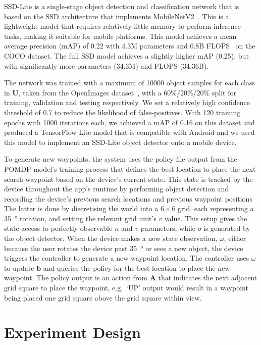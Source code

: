 \documentclass[runningheads]{llncs}
\begin{document}
SSD-Lite is a single-stage object detection and classification network that is based on the SSD architecture that implements MobileNetV2~\cite{sandler2018mobilenetv2}.
This is a lightweight model that requires relatively little memory to perform inference tasks, making it suitable for mobile platforms. 
This model achieves a mean average precision (mAP) of 0.22 with 4.3M parameters and 0.8B FLOPS~\cite{li2018tinydsod} on the COCO dataset.
The full SSD model achieves a slightly higher mAP (0.25), but with significantly more parameters (34.3M) and FLOPS (34.36B).

The network was trained with a maximum of 10000 object samples for each class in $\mathbf{U}$, taken from the OpenImages dataset~\cite{openimages}, with a 60\%/20\%/20\% split for training, validation and testing respectively.
We set a relatively high confidence threshold of 0.7 to reduce the likelihood of false-positives.
With 120 training epochs with 1000 iterations each, we achieved a mAP of 0.16 on this dataset and produced a TensorFlow Lite model that is compatible with Android and we used this model to implement an SSD-Lite object detector onto a mobile device.

To generate new waypoints, the system uses the policy file output from the POMDP model's training process that defines the best location to place the next search waypoint based on the device's current state.
This state is tracked by the device throughout the app's runtime by performing object detection and recording the device's previous search locations and previous waypoint positions
The latter is done by discretising the world into a $6\times6$ grid, each representing a \SI{35}{\degree} rotation, and setting the relevant grid unit's $v$ value.
This setup gives the state access to perfectly observable $n$ and $v$ parameters, while $o$ is generated by the object detector. 
When the device makes a new state observation, $\omega$, either because the user rotates the device past \SI{35}{\degree} or sees a new object, the device triggers the controller to generate a new waypoint location.
The controller uses $\omega$ to update $\mathbf{b}$ and queries the policy for the best location to place the new waypoint. 
The policy output is an action from $\mathbf{A}$ that indicates the next adjacent grid square to place the waypoint, e.g.\ `UP' output would result in a waypoint being placed one grid square above the grid square within view. 

\section{Experiment Design}\label{sec:experiments}
\end{document}
